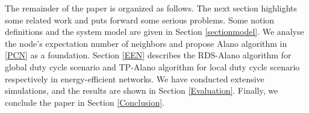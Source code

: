 The remainder of the paper is organized as follows.
The next section highlights some related work and 
puts forward some serious problems. 
Some notion definitions and the system model are given in Section
\ref{sectionmodel}. 
We analyse the node's expectation number of neighbors and 
propose Alano algorithm in \ref{PCN} as a foundation.
Section \ref{EEN} describes the RDS-Alano algorithm for global
duty cycle scenario and TP-Alano algorithm for local duty cycle scenario
respectively in energy-efficient networks.
We have conducted extensive simulations, and the results are shown in Section
\ref{Evaluation}. Finally, we conclude the paper in Section
\ref{Conclusion}.

